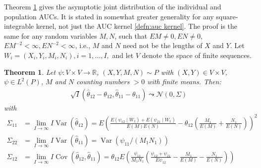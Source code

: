 \documentclass[12pt]{article}
\DeclareMathOperator{\AUC}{AUC}
\DeclareMathOperator{\V}{Var}
\DeclareMathOperator{\cov}{Cov}
\newcommand{\I}{I}
\newcommand{\E}{E}
\renewcommand{\P}{P}
\newcommand{\cind}{\perp \!\!\! \perp}
\newcommand{\aucindiv}{\theta_{11}}%
\newcommand{\aucpop}{\theta_{12}}%
\newcommand{\aucindivhat}{\hat{\theta}_{11}}%
\newcommand{\aucpophat}{\hat{\theta}_{12}}%
\newcommand{\Kernel}{\psi}
\newcommand{\W}[1]{W_{#1}}
\newcommand{\seqspace}{V}%
\newtheorem{theorem}{Theorem}
\begin{document}
Theorem \ref{theorem:asymptotic} gives the asymptotic joint
distribution of the individual and population AUCs. It is stated in
somewhat greater generality for any square-integrable kernel, not just
the AUC kernel \eqref{defn:auc kernel}. The proof is the same for any
random variables $M,N$, such that $\E M\neq 0, \E N\neq 0$,
$\E M^{-2}<\infty,\E N^{-2}<\infty$, i.e., $M$ and $N$ need not be the
lengths of $X$ and $Y$.  Let $\W{i}=(X_i,Y_i,M_i,N_i),i=1,\ldots,\I,$ and let $\seqspace$ denote the space of finite sequences.
\begin{theorem}\label{theorem:asymptotic} Let $\psi:V\times V\to\mathbb{R}$, $(X,Y,M,N)\sim\P$ with $(X,Y)\in V\times V$, $\psi\in L^2(\P)$, $M$ and $N$ counting numbers $> 0$ with finite means. Then:
  \begin{align}
    \sqrt{\I}(\aucpophat-\aucpop,\aucindivhat-\aucindiv) \leadsto \mathcal{N}(0,\Sigma)
  \end{align}
  with
  \begin{align}
    \Sigma_{11} &= \lim_{\I\to\infty} \I\V(\aucpophat) =
    \E\left(\frac{\E(\Kernel_{12}\mid\W{1})+\E(\Kernel_{21}\mid\W{1})}{\E (M)\E (N)} - \aucpop\left(\frac{M_1}{\E (M)} + \frac{N_1}{\E (N)}\right)   \right)^2
    \\
    \Sigma_{22} &= \lim_{\I\to\infty} \I\V(\aucindivhat) =
    \V(\Kernel_{11}/(M_1N_1))
    \\
    \Sigma_{12} &= \lim_{\I\to\infty} \I\cov(\aucpophat,\aucindivhat) =
    \aucpop\E\left(\frac{\Kernel_{11}}{M_1N_1}\left(\frac{\Kernel_{12}+\Kernel_{21}}{\E\Kernel_{12}} - \frac{M_1}{\E (M)}-\frac{N_1}{\E (N)}  \right) \right)
  \end{align}
\end{theorem}
\end{document}

